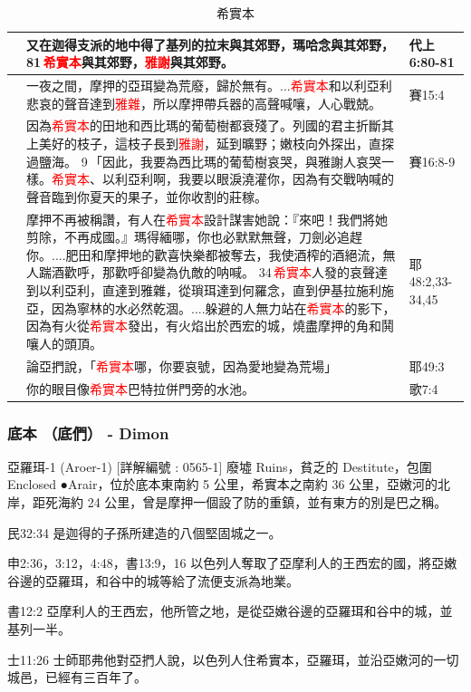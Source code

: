 \begin{table}[H]
\begin{tabular}{p{}|p{14cm}|p{1.5cm}}
&又在迦得支派的地中得了基列的拉末與其郊野，瑪哈念與其郊野， 81 \textcolor{red}{希實本}與其郊野，\textcolor{red}{雅謝}與其郊野。&代上6:80-81\\\hline
&一夜之間，摩押的亞珥變為荒廢，歸於無有。...\textcolor{red}{希實本}和以利亞利悲哀的聲音達到\textcolor{red}{雅雜}，所以摩押帶兵器的高聲喊嚷，人心戰兢。&賽15:4\\\hline
&因為\textcolor{red}{希實本}的田地和西比瑪的葡萄樹都衰殘了。列國的君主折斷其上美好的枝子，這枝子長到\textcolor{red}{雅謝}，延到曠野；嫩枝向外探出，直探過鹽海。 9 「因此，我要為西比瑪的葡萄樹哀哭，與雅謝人哀哭一樣。\textcolor{red}{希實本}、以利亞利啊，我要以眼淚澆灌你，因為有交戰呐喊的聲音臨到你夏天的果子，並你收割的莊稼。&賽16:8-9\\\hline
&摩押不再被稱讚，有人在\textcolor{red}{希實本}設計謀害她說：『來吧！我們將她剪除，不再成國。』瑪得緬哪，你也必默默無聲，刀劍必追趕你。....肥田和摩押地的歡喜快樂都被奪去，我使酒榨的酒絕流，無人踹酒歡呼，那歡呼卻變為仇敵的呐喊。 34 \textcolor{red}{希實本}人發的哀聲達到以利亞利，直達到雅雜，從瑣珥達到何羅念，直到伊基拉施利施亞，因為寧林的水必然乾涸。....躲避的人無力站在\textcolor{red}{希實本}的影下，因為有火從\textcolor{red}{希實本}發出，有火焰出於西宏的城，燒盡摩押的角和鬨嚷人的頭頂。&耶48:2,33-34,45\\\hline
&論亞捫說，「\textcolor{red}{希實本}哪，你要哀號，因為愛地變為荒場」&耶49:3\\\hline
&你的眼目像\textcolor{red}{希實本}巴特拉併門旁的水池。&歌7:4\\\hline
\end{tabular}
\caption{希實本}
\end{table}

\subsubsection{底本 （底們） - Dimon}
 亞羅珥-1   (Aroer-1) [詳解編號 : 0565-1]
廢墟 Ruins，貧乏的 Destitute，包圍 Enclosed
●Arair，位於底本東南約 5 公里，希實本之南約 36 公里，亞嫩河的北岸，距死海約 24 公里，曾是摩押一個設了防的重鎮，並有東方的別是巴之稱。

民32:34 是迦得的子孫所建造的八個堅固城之一。

申2:36，3:12，4:48，書13:9，16 以色列人奪取了亞摩利人的王西宏的國，將亞嫩谷邊的亞羅珥，和谷中的城等給了流便支派為地業。

書12:2 亞摩利人的王西宏，他所管之地，是從亞嫩谷邊的亞羅珥和谷中的城，並基列一半。

士11:26 士師耶弗他對亞捫人說，以色列人住希實本，亞羅珥，並沿亞嫩河的一切城邑，已經有三百年了。

